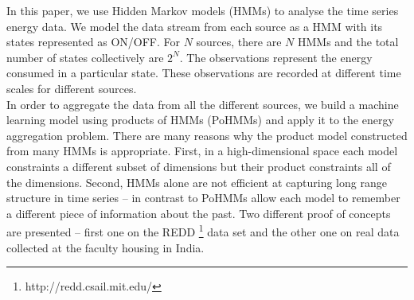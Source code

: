 \documentclass{acm_proc_article-sp}
\begin{document}
In this paper, we use Hidden Markov models (HMMs) to analyse the time series energy data.
We model the data stream from each source as a HMM with its states represented as ON/OFF.  For $N$ sources, there are $N$ HMMs and  the total number of states collectively are $2^N$. The observations represent the energy consumed in a particular state. These observations are recorded at different time scales for different sources. \\
In order to aggregate the data from all the different sources, we build a machine learning model using products of HMMs (PoHMMs) and apply it to the energy aggregation problem. There are many reasons why the product model constructed from many HMMs is appropriate. 
First, in a high-dimensional space each model constraints a different subset of dimensions but their product constraints all of the dimensions.
Second, HMMs alone are not efficient at capturing long range structure in time series \cite{Taylor} -- in contrast to PoHMMs  \cite{andrew} allow each model to remember a different piece of information about the past.
Two different proof of concepts are presented -- first one on the REDD \footnote{http://redd.csail.mit.edu/} data set and the other one on real data collected at the faculty housing in India. 

\end{document}
